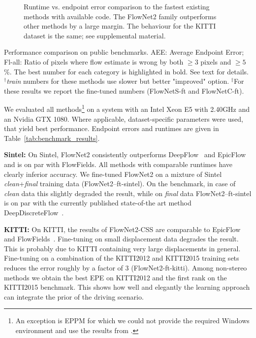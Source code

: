 \documentclass[10pt,twocolumn,letterpaper]{article}%
\newcommand{\FN}[1]{\mbox{FlowNet2-#1}\xspace}
\begin{document}
\begin{figure}%
  \begin{center}%
    
  \end{center}%
  \caption{Runtime vs. endpoint error comparison to the fastest existing methods with available code. The FlowNet2 family outperforms other methods by a large margin. The behaviour for the KITTI dataset is the same; see supplemental material.}%
  \label{fig:benchmark_plots}%
\end{figure}%

\begin{table}[t]
  \begin{center}%
     
  \end{center}%
  \caption{Performance comparison on public benchmarks. AEE: Average Endpoint Error; Fl-all: Ratio of pixels where flow estimate is wrong by both $\geq3$ pixels and $\geq5$\%. The best number for each category is highlighted in bold. See text for details. $^\dagger$\textit{train} numbers for these methods use slower but better "improved" option. $^\ddagger$For these results we report the fine-tuned numbers (FlowNetS-ft and FlowNetC-ft).
  }%
  \label{tab:benchmark_results}%
\end{table}%

We evaluated all methods\footnote{An exception is EPPM for which we could not provide the required Windows environment and use the results from \cite{eppm}.} on a system with an Intel Xeon E5 with 2.40GHz and an Nvidia GTX 1080. Where applicable, dataset-specific parameters were used, that yield best performance. Endpoint errors and runtimes are given in Table~\ref{tab:benchmark_results}. 

\textbf{Sintel:} On Sintel, FlowNet2 consistently outperforms DeepFlow~\cite{deepflow} and EpicFlow~\cite{epicflow} and is on par with FlowFields. All methods with comparable runtimes have clearly inferior accuracy. We fine-tuned FlowNet2 on a mixture of Sintel \textit{clean}+\textit{final} training data (\FN{-ft-sintel}). On the benchmark, in case of \textit{clean} data this slightly degraded the result, while on \textit{final} data \FN{-ft-sintel} is on par with the currently published state-of-the art method DeepDiscreteFlow~\cite{deepdiscreteflow}. 

\textbf{KITTI:} On KITTI, the results of \FN{CSS} are comparable to EpicFlow~\cite{epicflow} and FlowFields~\cite{flowfields}. Fine-tuning on small displacement data degrades the result. This is probably due to KITTI containing very large displacements in general. Fine-tuning on a combination of the KITTI2012 and KITTI2015 training sets reduces the error roughly by a factor of $3$ (\FN{ft-kitti}). Among non-stereo methods we obtain the best EPE on KITTI2012 and the first rank on the KITTI2015 benchmark. This shows how well and elegantly the learning approach can integrate the prior of the driving scenario. 
\end{document}

